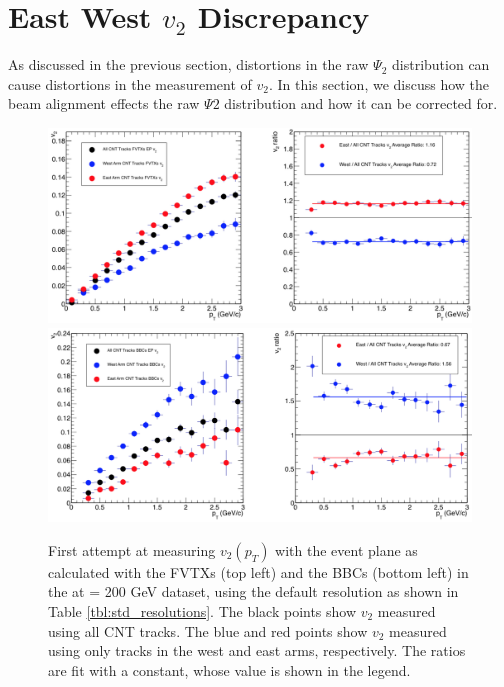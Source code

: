 \section{East West $v_2$ Discrepancy}
As discussed in the previous section, distortions in the raw $\Psi_2$ distribution can cause distortions in the measurement of $v_2$. In this section, we discuss how the beam alignment effects the raw $\Psi2$ distribution and how it can be corrected for.
\begin{figure}[!h]
\begin{center}
\includegraphics[width=0.85\linewidth]{figs/fvtxs_default_ew.png}
\includegraphics[width=0.85\linewidth]{figs/bbcs_default_ew.png}
\caption{First attempt at measuring $v_{2} (p_T)$ with the event plane as calculated with the FVTXs (top left) and the BBCs (bottom left) in the \pau at \sqsn = 200 GeV dataset, using the default resolution as shown in Table \ref{tbl:std_resolutions}. The black points show $v_2$ measured using all CNT tracks. The blue and red points show $v_2$ measured using only tracks in the west and east arms, respectively. The ratios are fit with a constant, whose value is shown in the legend.}
\label{fig:fvtx_ew_default}
\end{center}
\end{figure}

